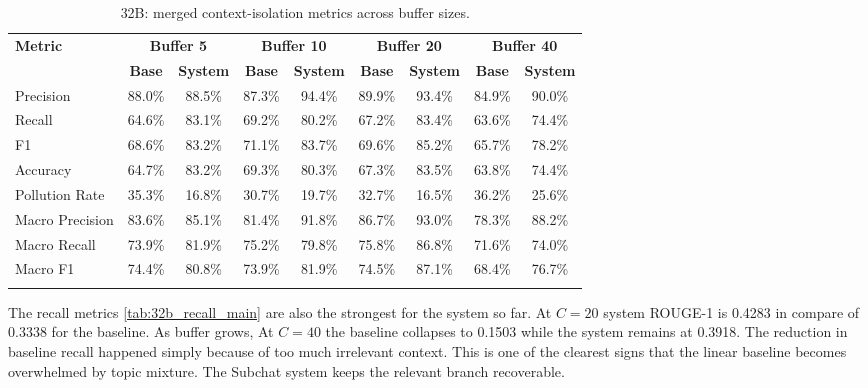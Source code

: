 \documentclass[pdflatex,sn-mathphys-num]{sn-jnl}%
\theoremstyle{thmstyleone}%
\theoremstyle{thmstyletwo}%
\theoremstyle{thmstylethree}%
\begin{document}
\begin{table}[htbp]
\caption{32B: merged context-isolation metrics across buffer sizes.}\label{tab:32b_context_main}
\centering
\scriptsize
\setlength{\tabcolsep}{3pt}
\begin{adjustbox}{width=\textwidth}
\begin{tabular}{lcccccccc}
\toprule
\textbf{Metric} & \multicolumn{2}{c}{\textbf{Buffer 5}} & \multicolumn{2}{c}{\textbf{Buffer 10}} & \multicolumn{2}{c}{\textbf{Buffer 20}} & \multicolumn{2}{c}{\textbf{Buffer 40}} \\
\cmidrule(lr){2-3}\cmidrule(lr){4-5}\cmidrule(lr){6-7}\cmidrule(lr){8-9}
 & \textbf{Base} & \textbf{System} & \textbf{Base} & \textbf{System} & \textbf{Base} & \textbf{System} & \textbf{Base} & \textbf{System} \\
\midrule
Precision & 88.0\% & 88.5\% & 87.3\% & 94.4\% & 89.9\% & 93.4\% & 84.9\% & 90.0\% \\
Recall & 64.6\% & 83.1\% & 69.2\% & 80.2\% & 67.2\% & 83.4\% & 63.6\% & 74.4\% \\
F1 & 68.6\% & 83.2\% & 71.1\% & 83.7\% & 69.6\% & 85.2\% & 65.7\% & 78.2\% \\
Accuracy & 64.7\% & 83.2\% & 69.3\% & 80.3\% & 67.3\% & 83.5\% & 63.8\% & 74.4\% \\
Pollution Rate & 35.3\% & 16.8\% & 30.7\% & 19.7\% & 32.7\% & 16.5\% & 36.2\% & 25.6\% \\
Macro Precision & 83.6\% & 85.1\% & 81.4\% & 91.8\% & 86.7\% & 93.0\% & 78.3\% & 88.2\% \\
Macro Recall & 73.9\% & 81.9\% & 75.2\% & 79.8\% & 75.8\% & 86.8\% & 71.6\% & 74.0\% \\
Macro F1 & 74.4\% & 80.8\% & 73.9\% & 81.9\% & 74.5\% & 87.1\% & 68.4\% & 76.7\% \\
\botrule
\end{tabular}
\end{adjustbox}
\end{table}

The recall metrics \ref{tab:32b_recall_main} are also the strongest for the system so far. At $C=20$ system ROUGE-1 is 0.4283 in compare of 0.3338 for the baseline. As buffer grows, At $C=40$ the baseline collapses to 0.1503 while the system remains at 0.3918. The reduction in baseline recall happened simply because of too much irrelevant context. This is one of the clearest signs that the linear baseline becomes overwhelmed by topic mixture. The Subchat system keeps the relevant branch recoverable.
\end{document}
